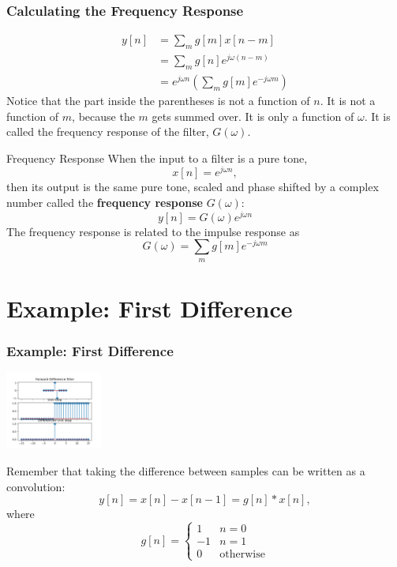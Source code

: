 \documentclass{beamer}
\begin{document}
\begin{frame}
  \frametitle{Calculating the Frequency Response}

  
  \begin{align*}
    y[n] &= \sum_m g[m] x[n-m]\\
    &= \sum_m g[n] e^{j\omega (n-m)}\\
    &= e^{j\omega n} \left(\sum_m g[m] e^{-j\omega m}\right)
  \end{align*}
  Notice that the part inside the parentheses is not a function of
  $n$.  It is not a function of $m$, because the $m$ gets summed over.
  It is only a function of $\omega$.  It is called the frequency
  response of the filter, $G(\omega)$.
\end{frame}

\begin{frame}
  \begin{block}{Frequency Response}
    When the input to a filter is a pure tone,
    \[
    x[n] =e^{j\omega n},
    \]
    then its output is the same pure tone, scaled and phase shifted by  a  complex number
    called the {\bf frequency response} $G(\omega)$:
    \[
    y[n] = G(\omega) e^{j\omega n}
    \]
    The frequency response is related to the impulse response as
    \[
    G(\omega) = \sum_m g[m]e^{-j\omega m}
    \]
  \end{block}
\end{frame}

\section[Example]{Example: First Difference}
\setcounter{subsection}{1}

\begin{frame}
  \frametitle{Example: First Difference}

  \centerline{\includegraphics[height=1in]{../lec02/mp1fig5.png}}
  
  Remember that taking the difference between samples can be written as a convolution:
  \[ y[n] = x[n]-x[n-1]= g[n]\ast x[n],\]
  where
  \[
  g[n]=\begin{cases}1 & n=0\\-1&n=1\\0&\mbox{otherwise}\end{cases}
  \]
\end{frame}
\end{document}

